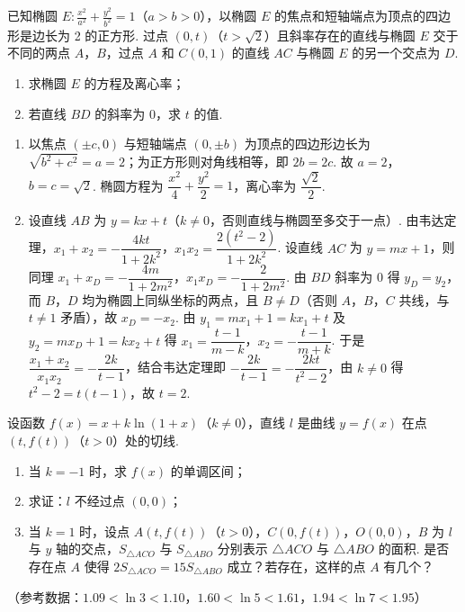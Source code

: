 \begin{problem}
已知椭圆 \(E:\frac{x^2}{a^2}+\frac{y^2}{b^2}=1\)（\(a>b>0\)），以椭圆 \(E\) 的焦点和短轴端点为顶点的四边形是边长为 2 的正方形. 过点 \((0,t)\)（\(t>\sqrt{2}\)）且斜率存在的直线与椭圆 \(E\) 交于不同的两点 \(A\)，\(B\)，过点 \(A\) 和 \(C(0,1)\) 的直线 \(AC\) 与椭圆 \(E\) 的另一个交点为 \(D\).

\begin{enumerate}
\item 求椭圆 \(E\) 的方程及离心率；
\item 若直线 \(BD\) 的斜率为 0，求 \(t\) 的值.
\end{enumerate}
\end{problem}

\begin{solution}
\begin{enumerate}
\item 以焦点 \((\pm c,0)\) 与短轴端点 \((0,\pm b)\) 为顶点的四边形边长为 \(\sqrt{b^2+c^2}=a=2\)；为正方形则对角线相等，即 \(2b=2c\). 故 \(a=2\)，\(b=c=\sqrt2\). 椭圆方程为 \(\dfrac{x^2}{4}+\dfrac{y^2}{2}=1\)，离心率为 \(\dfrac{\sqrt2}{2}\).
\item 设直线 \(AB\) 为 \(y=kx+t\)（\(k\ne0\)，否则直线与椭圆至多交于一点）. 由韦达定理，\(x_1+x_2=-\dfrac{4kt}{1+2k^2}\)，\(x_1x_2=\dfrac{2(t^2-2)}{1+2k^2}\). 设直线 \(AC\) 为 \(y=mx+1\)，则同理 \(x_1+x_D=-\dfrac{4m}{1+2m^2}\)，\(x_1x_D=-\dfrac{2}{1+2m^2}\). 由 \(BD\) 斜率为 \(0\) 得 \(y_D=y_2\)，而 \(B\)，\(D\) 均为椭圆上同纵坐标的两点，且 \(B\ne D\)（否则 \(A\)，\(B\)，\(C\) 共线，与 \(t\ne1\) 矛盾），故 \(x_D=-x_2\). 由 \(y_1=mx_1+1=kx_1+t\) 及 \(y_2=mx_D+1=kx_2+t\) 得 \(x_1=\dfrac{t-1}{m-k}\)，\(x_2=-\dfrac{t-1}{m+k}\). 于是 \(\dfrac{x_1+x_2}{x_1x_2}=-\dfrac{2k}{t-1}\)，结合韦达定理即 \(-\dfrac{2k}{t-1}=-\dfrac{2kt}{t^2-2}\)，由 \(k\ne0\) 得 \(t^2-2=t(t-1)\)，故 \(t=2\).
\end{enumerate}
\end{solution}

\begin{problem}
设函数 \(f(x)=x+k\ln(1+x)\)（\(k\ne 0\)），直线 \(l\) 是曲线 \(y=f(x)\) 在点 \((t,f(t))\)（\(t>0\)）处的切线.

\begin{enumerate}
\item 当 \(k=-1\) 时，求 \(f(x)\) 的单调区间；
\item 求证：\(l\) 不经过点 \((0,0)\)；
\item 当 \(k=1\) 时，设点 \(A(t,f(t))\)（\(t>0\)），\(C(0,f(t))\)，\(O(0,0)\)，\(B\) 为 \(l\) 与 \(y\) 轴的交点，\(S_{\triangle ACO}\) 与 \(S_{\triangle ABO}\) 分别表示 \(\triangle ACO\) 与 \(\triangle ABO\) 的面积. 是否存在点 \(A\) 使得 \(2S_{\triangle ACO}=15S_{\triangle ABO}\) 成立？若存在，这样的点 \(A\) 有几个？
\end{enumerate}

（参考数据：\(1.09<\ln 3<1.10\)，\(1.60<\ln 5<1.61\)，\(1.94<\ln 7<1.95\)）
\end{problem}

